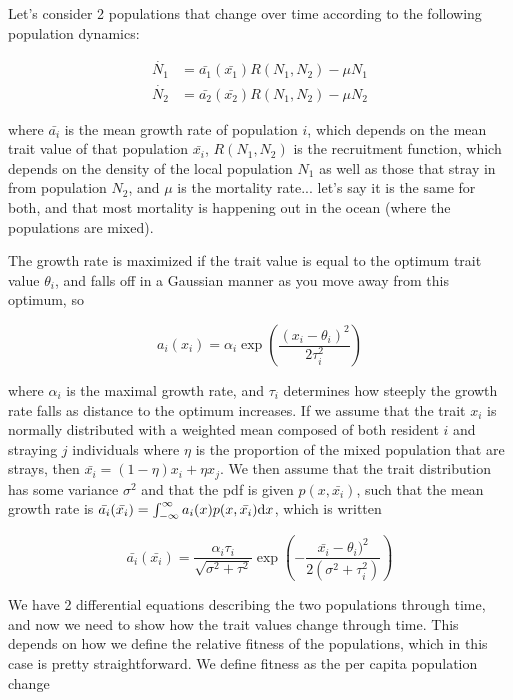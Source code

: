 \documentclass[twocolumn,preprintnumbers,amsmath,amssymb,superscriptaddress]{revtex4}
\begin{document}
Let's consider 2 populations that change over time according to the following population dynamics:

\begin{eqnarray}
  \dot{N_1} &= \bar{a_1}(\bar{x_1})R(N_1,N_2)-\mu N_1 \\
  \dot{N_2} &= \bar{a_2}(\bar{x_2})R(N_1,N_2)-\mu N_2
\end{eqnarray}

\noindent where $\bar{a_i}$ is the mean growth rate of population $i$, which depends on the mean trait value of that population $\bar{x_i}$, $R(N_1,N_2)$ is the recruitment function, which depends on the density of the local population $N_1$ as well as those that stray in from population $N_2$, and $\mu$ is the mortality rate... let's say it is the same for both, and that most mortality is happening out in the ocean (where the populations are mixed).

The growth rate is maximized if the trait value is equal to the optimum trait value $\theta_i$, and falls off in a Gaussian manner as you move away from this optimum, so

\begin{equation}
  a_i(x_i) = \alpha_i\exp\left(\frac{(x_i-\theta_i)^2}{2\tau_i^2}\right)
\end{equation}

\noindent where $\alpha_i$ is the maximal growth rate, and $\tau_i$ determines how steeply the growth rate falls as distance to the optimum increases.
If we assume that the trait $x_i$ is normally distributed with a weighted mean composed of both resident $i$ and straying $j$ individuals where $\eta$ is the proportion of the mixed population that are strays, then $\bar{x_i} = (1-\eta)x_i + \eta x_j$.
We then assume that the trait distribution has some variance $\sigma^2$ and that the pdf is given $p(x,\bar{x_i})$, such that the mean growth rate is $\bar{a_i}(\bar{x_i}) = \int_{-\infty}^\infty a_i(x)p(x,\bar{x_i}){\rm d}x$, which is written

\begin{equation}
  \bar{a_i}(\bar{x_i}) = \frac{\alpha_i \tau_i}{\sqrt{\sigma^2+\tau^2}}\exp\left(-\frac{\bar{x_i}-\theta_i)^2}{2(\sigma^2+\tau_i^2)}\right)
\end{equation}

We have 2 differential equations describing the two populations through time, and now we need to show how the trait values change through time.
This depends on how we define the relative fitness of the populations, which in this case is pretty straightforward.
We define fitness as the per capita population change
\end{document}
